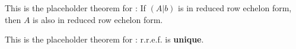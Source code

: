 \begin{additional theorem} \label{athm 3.17}
This is the placeholder theorem for :
If \((A|b)\) is in reduced row echelon form, then \(A\) is also in reduced row echelon form.
\end{additional theorem}

\begin{additional theorem} \label{athm 3.18}
This is the placeholder theorem for :
r.r.e.f. is \textbf{unique}.
\end{additional theorem}
